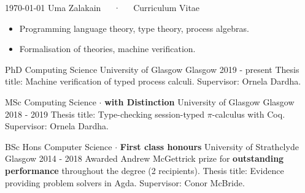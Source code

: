 \documentclass[11pt, a4paper]{awesome-cv}
\begin{document}
\makecvheader

\makecvfooter
  {\today}
  {Uma Zalakain~~~·~~~Curriculum Vitae}
  {\thepage}



\begin{itemize}[noitemsep,wide=0pt]
    \item {Programming language theory, type theory, process algebras.}
    \item {Formalisation of theories, machine verification.}
\end{itemize}


\begin{cventries}
    \cventry
      {PhD Computing Science} %
      {University of Glasgow} %
      {Glasgow} %
      {2019 - present} %
      {
          Thesis title: Machine verification of typed process calculi.\newline
          Supervisor: Ornela Dardha.\newline
      }

    \cventry
      {MSc Computing Science $\cdot$ \textbf{with Distinction}} %
      {University of Glasgow} %
      {Glasgow} %
      {2018 - 2019} %
      {
          Thesis title: Type-checking session-typed $\pi$-calculus with Coq.\newline
          Supervisor: Ornela Dardha.\newline
      }

    \cventry
      {BSc Hons Computer Science $\cdot$ \textbf{First class honours}} %
      {University of Strathclyde} %
      {Glasgow} %
      {2014 - 2018} %
      {
          Awarded Andrew McGettrick prize for \textbf{outstanding performance}
          throughout the degree (2 recipients).\newline
          Thesis title: Evidence providing problem solvers in Agda.\newline
          Supervisor: Conor McBride.\newline
      }
\end{cventries}

\end{document}

